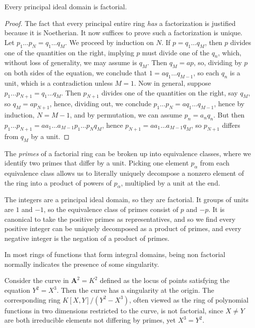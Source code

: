 \begin{theorem}
    Every principal ideal domain is factorial.
\end{theorem}
\begin{proof}
    The fact that every principal entire ring {\it has} a factorization is justified because it is Noetherian. It now suffices to prove such a factorization is unique. Let $p_1 \dots p_N = q_1 \dots q_M$. We proceed by induction on $N$. If $p = q_1 \dots q_M$, then $p$ divides one of the quantities on the right, implying $p$ must divide one of the $q_n$, which, without loss of generality, we may assume is $q_M$. Then $q_M = ap$, so, dividing by $p$ on both sides of the equation, we conclude that $1 = a q_1 \dots q_{M-1}$, so each $q_n$ is a unit, which is a contradiction unless $M = 1$. Now in general, suppose $p_1 \dots p_{N+1} = q_1 \dots q_M$. Then $p_{N+1}$ divides one of the quantities on the right, say $q_M$, so $q_M = ap_{N+1}$, hence, dividing out, we conclude $p_1 \dots p_N = a q_1 \dots q_{M-1}$, hence by induction, $N = M-1$, and by permutation, we can assume $p_n = a_nq_n$. But then $p_1 \dots p_{N+1} = aa_1 \dots a_{M-1} p_1 \dots p_N q_M$, hence $p_{N+1} = aa_1 \dots a_{M-1} q_M$, so $p_{N+1}$ differs from $q_M$ by a unit.
\end{proof}

The {\it primes} of a factorial ring can be broken up into equivalence classes, where we identify two primes that differ by a unit. Picking one element $p_\alpha$ from each equivalence class allows us to literally uniquely decompose a nonzero element of the ring into a product of powers of $p_\alpha$, multiplied by a unit at the end.

\begin{example}
    The integers are a principal ideal domain, so they are factorial. It groups of units are $1$ and $-1$, so the equivalence class of primes consist of $p$ and $-p$. It is canonical to take the positive primes as representatives, and so we find every positive integer can be uniquely decomposed as a product of primes, and every negative integer is the negation of a product of primes.
\end{example}

In most rings of functions that form integral domains, being non factorial normally indicates the presence of some singularity.

\begin{example}
    Consider the curve in $\mathbf{A}^2 = K^2$ defined as the locus of points satisfying the equation $Y^2 = X^3$. Then the curve has a singularity at the origin. The corresponding ring $K[X,Y]/(Y^2 - X^3)$, often viewed as the ring of polynomial functions in two dimensions restricted to the curve, is not factorial, since $X \neq Y$ are both irreducible elements not differing by primes, yet $X^3 = Y^2$.
\end{example}

